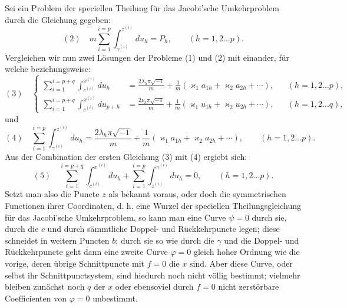 \documentclass[10pt]{article}
\begin{document}
Sei ein Problem der speciellen Theilung für das Jacobi'sche Umkehrproblem durch die Gleichung gegeben:
\[
(2)\quad m\sum_{i=1}^{i=p}\int_{\gamma^{(i)}}^{z^{(i)}}du_h=P_h,
\qquad (h=1,2\ldots p).
\]
Vergleichen wir nun zwei Lösungen der Probleme (1) und (2) mit einander, für welche beziehungsweise:
\[
(3)\quad
\left\{\begin{aligned}
\sum_{i=1}^{i=p+q}\int_{c^{(i)}}^{x^{(i)}}du_h
&=\frac{2\lambda_h\pi\sqrt{-1}}{m}
+\frac1m(\varkappa_1a_{1h}+\varkappa_2a_{2h}+\cdots),
&& (h=1,2\ldots p),\\
\sum_{i=1}^{i=p+q}\int_{c^{(i)}}^{x^{(i)}}du_{p+h}
&=\frac{2\nu_h\pi\sqrt{-1}}{m}
+\frac1m(\varkappa_1u_{1h}+\varkappa_2u_{2h}+\cdots),
&& (h=1,2\ldots q),
\end{aligned}\right.
\]
und
\[
(4)\quad
\sum_{i=1}^{i=p}\int_{\gamma^{(i)}}^{z^{(i)}}du_h
=\frac{2\lambda_h\pi\sqrt{-1}}{m}
+\frac1m(\varkappa_1a_{1h}+\varkappa_2a_{2h}+\cdots),
\qquad (h=1,2\ldots p).
\]
Aus der Combination der ersten Gleichung (3) mit (4) ergiebt sich:
\[
(5)\quad
\sum_{i=1}^{i=p+q}\int_{c^{(i)}}^{x^{(i)}}du_h
+\sum_{i=1}^{i=p}\int_{z^{(i)}}^{\gamma^{(i)}}du_h=0,
\qquad (h=1,2\ldots p).
\]
Setzt man also die Puncte \(z\) als bekannt voraus, oder doch die symmetrischen Functionen ihrer Coordinaten, d. h. eine Wurzel der speciellen Theilungsgleichung für das Jacobi'sche Umkehrproblem, so kann man eine Curve \(\psi=0\) durch sie, durch die \(c\) und durch sämmtliche Doppel- und Rückkehrpuncte legen; diese schneidet in weitern Puncten \(b\); durch sie so wie durch die \(\gamma\) und die Doppel- und Rückkehrpuncte geht dann eine zweite Curve \(\varphi=0\) gleich hoher Ordnung wie die vorige, deren übrige Schnittpuncte mit \(f=0\) die \(x\) sind. Aber diese Curve, oder selbst ihr Schnittpunctsystem, sind hiedurch noch nicht völlig bestimmt; vielmehr bleiben zunächst noch \(q\) der \(x\) oder ebensoviel durch \(f=0\) nicht zerstörbare Coefficienten von \(\varphi=0\) unbestimmt.
\end{document}
